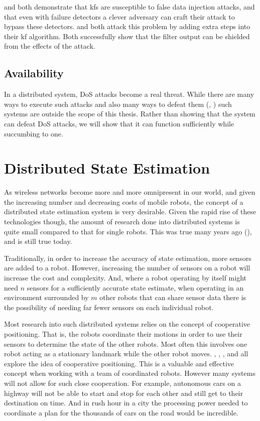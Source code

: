 \documentclass[thesis.tex]{subfile}
\begin{document}
\cite{Mo2010} and \cite{Yang2013} both demonstrate that \glspl{kf} are susceptible to false data injection attacks, and that even with failure detectors a clever adversary can craft their attack to bypass these detectors. \cite{Bezzo_2014} and \cite{Mo2014} both attack this problem by adding extra steps into their \gls{kf} algorithm. Both successfully show that the filter output can be shielded from the effects of the attack.

\subsection{Availability}
In a distributed system, \gls{DoS} attacks become a real threat. While there are many ways to execute such attacks and also many ways to defeat them (\cite{wood2002denial}, \cite{bellardo2003802}) such systems are outside the scope of this thesis. Rather than showing that the system can defeat \gls{DoS} attacks, we will show that it can function sufficiently while succumbing to one.

\section{Distributed State Estimation}
As wireless networks become more and more omnipresent in our world, and given the increasing number and decreasing costs of mobile robots, the concept of a distributed state estimation system is very desirable. Given the rapid rise of these technologies though, the amount of research done into distributed systems is quite small compared to that for single robots. This was true many years ago (\cite{Parker2000}), and is still true today.

Traditionally, in order to increase the accuracy of state estimation, more sensors are added to a robot. However, increasing the number of sensors on a robot will increase the cost and complexity. And, where a robot operating by itself might need $n$ sensors for a sufficiently accurate state estimate, when operating in an environment surrounded by $m$ other robots that can share sensor data there is the possibility of needing far fewer sensors on each individual robot.

Most research into such distributed systems relies on the concept of cooperative positioning. That is, the robots coordinate their motions in order to use their sensors to determine the state of the other robots. Most often this involves one robot acting as a stationary landmark while the other robot moves. \cite{Kurazume1994}, \cite{Kurazume1996}, \cite{Kurazume1998}, and \cite{Kurazume2000} all explore the idea of cooperative positioning. This is a valuable and effective concept when working with a team of coordinated robots. However many systems will not allow for such close cooperation. For example, autonomous cars on a highway will not be able to start and stop for each other and still get to their destination on time. And in rush hour in a city the processing power needed to coordinate a plan for the thousands of cars on the road would be incredible.
\end{document}
